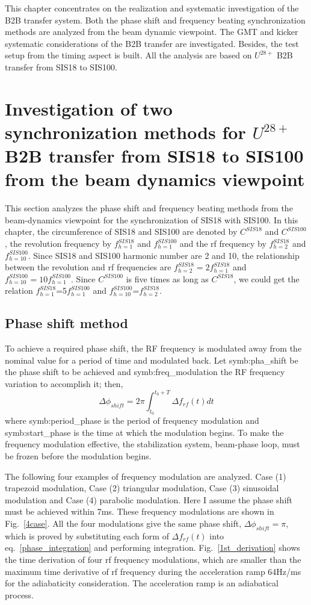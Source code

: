 This chapter concentrates on the realization and systematic investigation of the \gls{B2B} transfer system. Both the phase shift and frequency beating synchronization methods are analyzed from the beam dynamic viewpoint. The \gls{GMT} and kicker systematic considerations of the B2B transfer are investigated. Besides, the test setup from the timing aspect is built. All the analysis are based on $U^{28+}$ B2B transfer from SIS18 to SIS100.
\section{Investigation of two synchronization methods for $U^{28+}$ B2B transfer from SIS18 to SIS100 from the beam dynamics viewpoint }
This section analyzes the phase shift and frequency beating methods from the beam-dynamics viewpoint for the synchronization of SIS18 with SIS100. In this chapter, the circumference of SIS18 and SIS100 are denoted by $C^{SIS18}$ and $C^{SIS100}$, the revolution frequency by $f_{h=1}^{SIS18}$ and $f_{h=1}^{SIS100}$ and the rf frequency by $f_{h=2}^{SIS18}$ and $f_{h=10}^{SIS100}$. Since SIS18 and SIS100 harmonic number are 2 and 10, the relationship between the revolution and rf frequencies are $f_{h=2}^{SIS18}=2f_{h=1}^{SIS18}$ and $f_{h=10}^{SIS100}=10f_{h=1}^{SIS100}$. Since $C^{SIS100}$ is five times as long as $C^{SIS18}$, we could get the relation  $f_{h=1}^{SIS18}$=5$f_{h=1}^{SIS100}$ and $f_{h=10}^{SIS100}$=$f_{h=2}^{SIS18}$.
\subsection{Phase shift method}
To achieve a required phase shift, the \gls{RF} frequency is modulated away from the nominal value for a period of time and modulated back. Let \gls{symb:pha_shift} be the phase shift to be achieved and \gls{symb:freq_modulation} the RF frequency variation to accomplish it; then,
\begin{equation}
\Delta \phi_{shift}= 2\pi \int_{t_0}^{t_0+T} \Delta f_{rf}(t)dt \label{phase_integration}
\end{equation}
where \gls{symb:period_phase} is the period of frequency modulation and \gls{symb:start_phase} is the time at which the modulation begins. To make the frequency modulation effective, the stabilization system, beam-phase loop, must be frozen before the modulation begins. 

The following four examples of frequency modulation are analyzed. Case (1) trapezoid modulation, Case (2) triangular modulation, Case (3) sinusoidal modulation and Case (4) parabolic modulation. Here I assume the phase shift must be achieved within 7ms. These frequency modulations are shown in Fig.~\ref{4case}. All the four modulations give the same phase shift, $\Delta \phi_{shift}=\pi$, which is
proved by substituting each form of $\Delta f_{rf}(t)$ into eq.~\ref{phase_integration} and performing integration. Fig.~\ref{1st_derivation} shows the time derivation of four rf frequency modulations, which are smaller than the maximum time derivative of rf frequency during the acceleration ramp 64Hz/ms for the adiabaticity consideration. The acceleration ramp is an adiabatical process.

